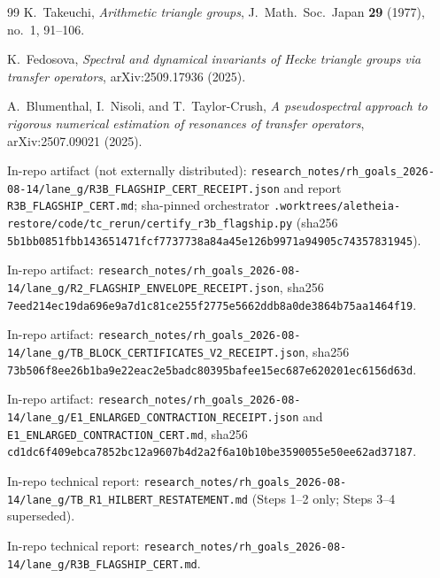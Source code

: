 \documentclass[11pt]{article}
\theoremstyle{definition}
\theoremstyle{remark}
\begin{document}
\begin{thebibliography}{99}
K.~Takeuchi,
\emph{Arithmetic triangle groups},
J.\ Math.\ Soc.\ Japan \textbf{29} (1977), no.~1, 91--106.

K.~Fedosova, %
\emph{Spectral and dynamical invariants of Hecke triangle groups via
transfer operators}, arXiv:2509.17936 (2025).

A.~Blumenthal, I.~Nisoli, and T.~Taylor-Crush, %
\emph{A pseudospectral approach to rigorous numerical estimation of
resonances of transfer operators}, arXiv:2507.09021 (2025).


In-repo artifact (not externally distributed):
\texttt{research\_notes/rh\_goals\_2026-08-14/lane\_g/R3B\_FLAGSHIP\_CERT\_RECEIPT.json}
and report \texttt{R3B\_FLAGSHIP\_CERT.md}; sha-pinned orchestrator
\texttt{.worktrees/aletheia-restore/code/tc\_rerun/certify\_r3b\_flagship.py}
(sha256 \texttt{5b1bb0851fbb143651471fcf7737738a84a45e126b9971a94905c74357831945}).

In-repo artifact:
\texttt{research\_notes/rh\_goals\_2026-08-14/lane\_g/R2\_FLAGSHIP\_ENVELOPE\_RECEIPT.json},
sha256 \texttt{7eed214ec19da696e9a7d1c81ce255f2775e5662ddb8a0de3864b75aa1464f19}.

In-repo artifact:
\texttt{research\_notes/rh\_goals\_2026-08-14/lane\_g/TB\_BLOCK\_CERTIFICATES\_V2\_RECEIPT.json},
sha256 \texttt{73b506f8ee26b1ba9e22eac2e5badc80395bafee15ec687e620201ec6156d63d}.

In-repo artifact:
\texttt{research\_notes/rh\_goals\_2026-08-14/lane\_g/E1\_ENLARGED\_CONTRACTION\_RECEIPT.json}
and \texttt{E1\_ENLARGED\_CONTRACTION\_CERT.md},
sha256 \texttt{cd1dc6f409ebca7852bc12a9607b4d2a2f6a10b10be3590055e50ee62ad37187}.

In-repo technical report:
\texttt{research\_notes/rh\_goals\_2026-08-14/lane\_g/TB\_R1\_HILBERT\_RESTATEMENT.md}
(Steps 1--2 only; Steps 3--4 superseded).

In-repo technical report:
\texttt{research\_notes/rh\_goals\_2026-08-14/lane\_g/R3B\_FLAGSHIP\_CERT.md}.


\end{thebibliography}
\end{document}
